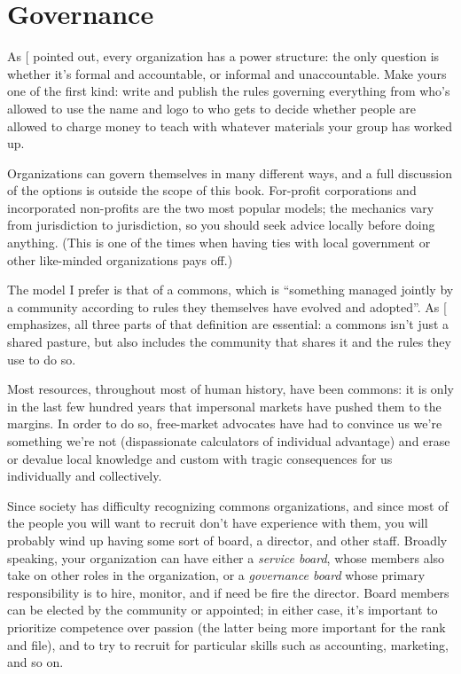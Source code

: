\section{Governance}\label{s:community-governance}

As {[}\protect[\hyperlink{b:Free1972}{Free1972}]{]} pointed out, every organization has a power
structure: the only question is whether it's formal and accountable, or
informal and unaccountable. Make yours one of the first kind: write and
publish the rules governing everything from who's allowed to use the
name and logo to who gets to decide whether people are allowed to charge
money to teach with whatever materials your group has worked up.

Organizations can govern themselves in many different ways, and a full
discussion of the options is outside the scope of this book. For-profit
corporations and incorporated non-profits are the two most popular models;
the mechanics vary from jurisdiction to jurisdiction, so you should seek
advice locally before doing anything. (This is one of the times when
having ties with local government or other like-minded organizations
pays off.)

The model I prefer is that of a commons, which is ``something managed
jointly by a community according to rules they themselves have evolved
and adopted''. As {[}\protect[\hyperlink{b:Boll2014}{Boll2014}]{]} emphasizes, all three parts of that
definition are essential: a commons isn't just a shared pasture, but
also includes the community that shares it and the rules they use to do
so.

Most resources, throughout most of human history, have been commons: it
is only in the last few hundred years that impersonal markets have
pushed them to the margins. In order to do so, free-market advocates
have had to convince us we're something we're not (dispassionate
calculators of individual advantage) and erase or devalue local
knowledge and custom with tragic consequences for us individually and
collectively.

Since society has difficulty recognizing commons organizations, and
since most of the people you will want to recruit don't have experience
with them, you will probably wind up having some sort of board, a
director, and other staff. Broadly speaking, your organization can have
either a \emph{service board}, whose members also take on other roles in the
organization, or a \emph{governance board} whose primary responsibility is to
hire, monitor, and if need be fire the director. Board members can be
elected by the community or appointed; in either case, it's important to
prioritize competence over passion (the latter being more important for
the rank and file), and to try to recruit for particular skills such as
accounting, marketing, and so on.

